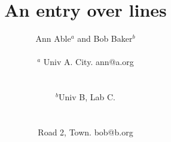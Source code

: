 \documentclass{article}

\title{An entry over lines}
\author{Ann Able$^{a}$ and Bob Baker$^{b}$ \\
\begin{small} $^{a}$ Univ A. City. ann@a.org \end{small} \\
\begin{small} $^{b}$Univ B, Lab C.\end{small} \\ \begin{small} Road 2, Town. bob@b.org \end{small}\\}
\date{}
\maketitle
Text.

